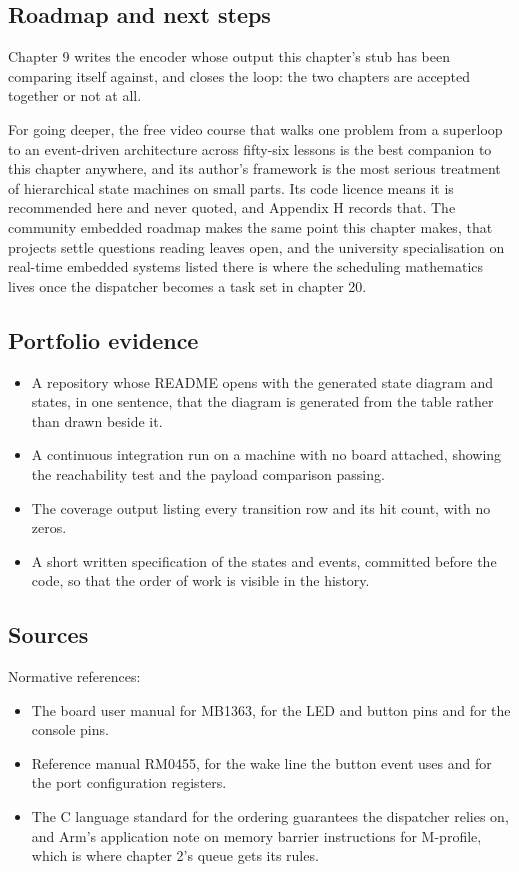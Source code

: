 \subsection*{Roadmap and next steps}

Chapter 9 writes the encoder whose output this chapter's stub has been
comparing itself against, and closes the loop: the two chapters are accepted
together or not at all.

For going deeper, the free video course that walks one problem from a superloop
to an event-driven architecture across fifty-six lessons is the best companion
to this chapter anywhere, and its author's framework is the most serious
treatment of hierarchical state machines on small parts. Its code licence means
it is recommended here and never quoted, and Appendix H records that. The
community embedded roadmap makes the same point this chapter makes, that
projects settle questions reading leaves open, and the university specialisation
on real-time embedded systems listed there is where the scheduling mathematics
lives once the dispatcher becomes a task set in chapter 20.

\subsection*{Portfolio evidence}

\begin{itemize}
\item A repository whose README opens with the generated state diagram and
states, in one sentence, that the diagram is generated from the table rather
than drawn beside it.
\item A continuous integration run on a machine with no board attached, showing
the reachability test and the payload comparison passing.
\item The coverage output listing every transition row and its hit count, with
no zeros.
\item A short written specification of the states and events, committed before
the code, so that the order of work is visible in the history.
\end{itemize}

\subsection*{Sources}

Normative references:
\begin{itemize}
\item The board user manual for MB1363, for the LED and button pins and for the
console pins.
\item Reference manual RM0455, for the wake line the button event uses and for
the port configuration registers.
\item The C language standard for the ordering guarantees the dispatcher
relies on, and Arm's application note on memory barrier instructions for
M-profile, which is where chapter 2's queue gets its rules.
\end{itemize}

